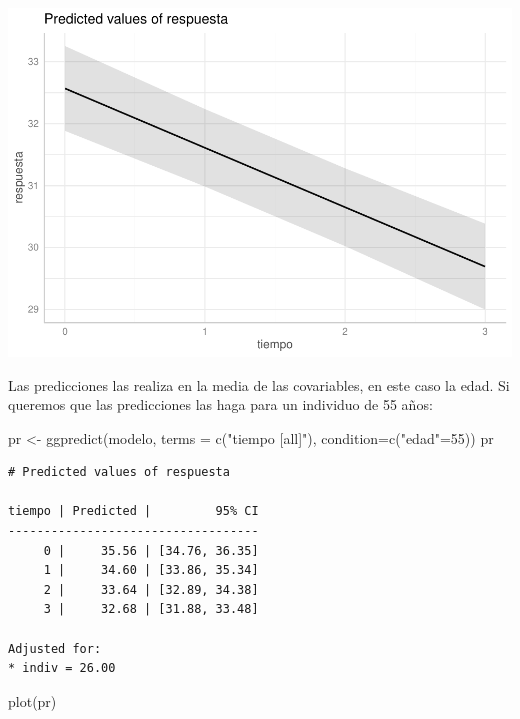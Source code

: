 \documentclass[
]{book}
\newenvironment{Shaded}{\begin{snugshade}}{\end{snugshade}}
\newcommand{\AttributeTok}[1]{\textcolor[rgb]{0.77,0.63,0.00}{#1}}
\newcommand{\DecValTok}[1]{\textcolor[rgb]{0.00,0.00,0.81}{#1}}
\newcommand{\FunctionTok}[1]{\textcolor[rgb]{0.00,0.00,0.00}{#1}}
\newcommand{\NormalTok}[1]{#1}
\newcommand{\OtherTok}[1]{\textcolor[rgb]{0.56,0.35,0.01}{#1}}
\newcommand{\StringTok}[1]{\textcolor[rgb]{0.31,0.60,0.02}{#1}}
\begin{document}
\includegraphics{fig_out/unnamed-chunk-131-2.pdf}

Las predicciones las realiza en la media de las covariables, en este caso la edad.
Si queremos que las predicciones las haga para un individuo de 55 años:

\begin{Shaded}
\begin{Highlighting}[]
\NormalTok{pr }\OtherTok{\textless{}{-}} \FunctionTok{ggpredict}\NormalTok{(modelo, }\AttributeTok{terms =} \FunctionTok{c}\NormalTok{(}\StringTok{"tiempo [all]"}\NormalTok{), }\AttributeTok{condition=}\FunctionTok{c}\NormalTok{(}\StringTok{"edad"}\OtherTok{=}\DecValTok{55}\NormalTok{))}
\NormalTok{pr}
\end{Highlighting}
\end{Shaded}

\begin{verbatim}
# Predicted values of respuesta

tiempo | Predicted |         95% CI
-----------------------------------
     0 |     35.56 | [34.76, 36.35]
     1 |     34.60 | [33.86, 35.34]
     2 |     33.64 | [32.89, 34.38]
     3 |     32.68 | [31.88, 33.48]

Adjusted for:
* indiv = 26.00
\end{verbatim}

\begin{Shaded}
\begin{Highlighting}[]
\FunctionTok{plot}\NormalTok{(pr)}
\end{Highlighting}
\end{Shaded}
\end{document}
